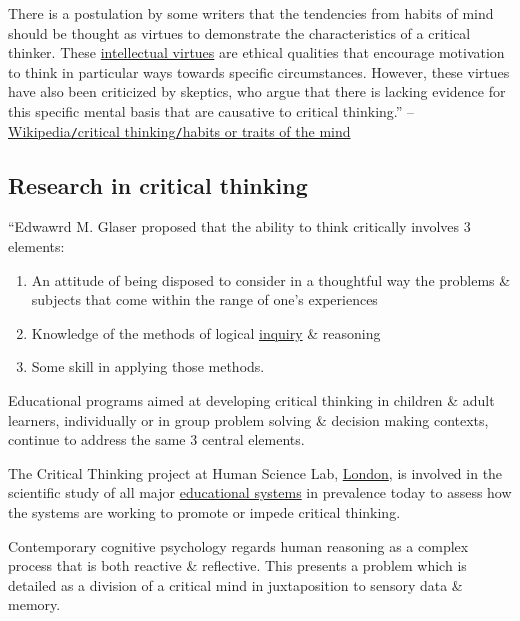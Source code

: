 \documentclass[oneside]{book}
\numberwithin{equation}{section}
\begin{document}
There is a postulation by some writers that the tendencies from habits of mind should be thought as virtues to demonstrate the characteristics of a critical thinker. These \href{https://en.wikipedia.org/wiki/Intellectual_virtue}{intellectual virtues} are ethical qualities that encourage motivation to think in particular ways towards specific circumstances. However, these virtues have also been criticized by skeptics, who argue that there is lacking evidence for this specific mental basis that are causative to critical thinking.'' -- \href{https://en.wikipedia.org/wiki/Critical_thinking#Habits_or_traits_of_the_mind}{Wikipedia\texttt{/}critical thinking\texttt{/}habits or traits of the mind}

\subsection{Research in critical thinking}
``Edwawrd M. Glaser proposed that the ability to think critically involves 3 elements:
\begin{enumerate}
	\item An attitude of being disposed to consider in a thoughtful way the problems \& subjects that come within the range of one's experiences
	\item Knowledge of the methods of logical \href{https://en.wikipedia.org/wiki/Inquiry}{inquiry} \& reasoning
	\item Some skill in applying those methods.
\end{enumerate}
Educational programs aimed at developing critical thinking in children \& adult learners, individually or in group problem solving \& decision making contexts, continue to address the same 3 central elements.

The Critical Thinking project at Human Science Lab, \href{https://en.wikipedia.org/wiki/London}{London}, is involved in the scientific study of all major \href{https://en.wikipedia.org/wiki/Educational_system}{educational systems} in prevalence today to assess how the systems are working to promote or impede critical thinking.

Contemporary cognitive psychology regards human reasoning as a complex process that is both reactive \& reflective. This presents a problem which is detailed as a division of a critical mind in juxtaposition to sensory data \& memory.
\end{document}
